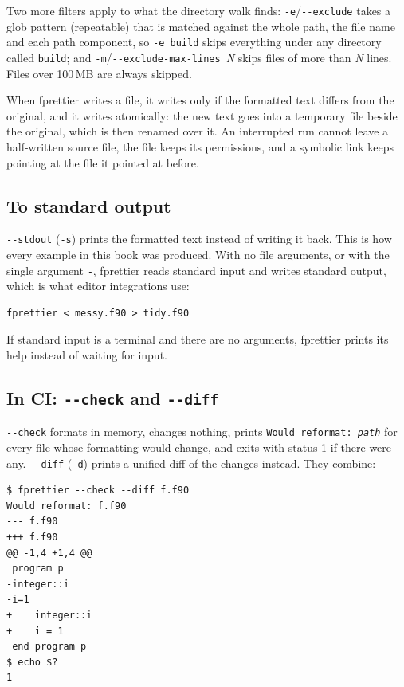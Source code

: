 \documentclass[11pt,a4paper,openany]{book}
\newcommand{\code}[1]{\texttt{\small #1}}
\newcommand{\file}[1]{\texttt{\small\color{accent}#1}}
\newcommand{\flag}[1]{\texttt{\small -{}-#1}}
\begin{document}
Two more filters apply to what the directory walk finds:
\code{-e}/\flag{exclude} takes a glob pattern (repeatable) that is matched
against the whole path, the file name and each path component, so
\code{-e build} skips everything under any directory called \file{build};
and \code{-m}/\flag{exclude-max-lines}~\textit{N} skips files of more than
\textit{N} lines. Files over 100\,MB are always skipped.

When fprettier writes a file, it writes only if the formatted text differs
from the original, and it writes atomically: the new text goes into a temporary
file beside the original, which is then renamed over it. An interrupted run
cannot leave a half-written source file, the file keeps its permissions, and a
symbolic link keeps pointing at the file it pointed at before.

\subsection{To standard output}

\flag{stdout} (\code{-s}) prints the formatted text instead of writing it back.
This is how every example in this book was produced. With no file arguments,
or with the single argument \code{-}, fprettier reads standard input and
writes standard output, which is what editor integrations use:

\begin{lstlisting}[style=shell]
fprettier < messy.f90 > tidy.f90
\end{lstlisting}

If standard input is a terminal and there are no arguments, fprettier prints
its help instead of waiting for input.

\subsection{In CI: \texttt{-{}-check} and \texttt{-{}-diff}}

\flag{check} formats in memory, changes nothing, prints
\code{Would reformat: \textit{path}} for every file whose formatting would
change, and exits with status 1 if there were any. \flag{diff} (\code{-d}) prints a
unified diff of the changes instead. They combine:

\begin{lstlisting}[style=shell]
$ fprettier --check --diff f.f90
Would reformat: f.f90
--- f.f90
+++ f.f90
@@ -1,4 +1,4 @@
 program p
-integer::i
-i=1
+    integer::i
+    i = 1
 end program p
$ echo $?
1
\end{lstlisting}
\end{document}
